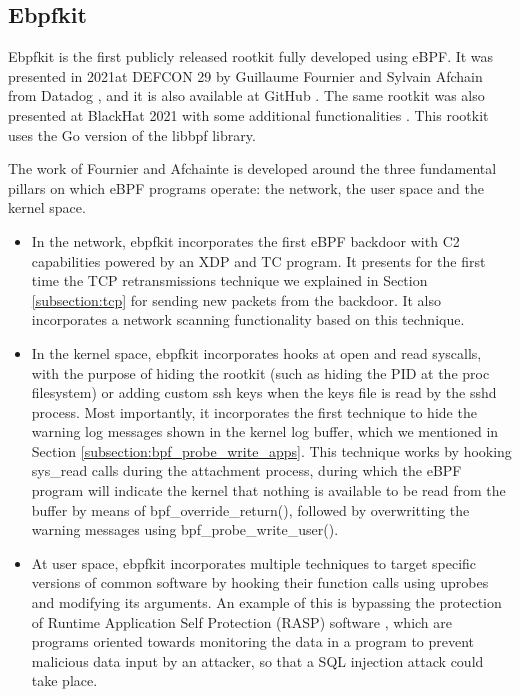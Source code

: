 \subsection{Ebpfkit}
Ebpfkit is the first publicly released rootkit fully developed using eBPF.
It was presented in 2021at DEFCON 29 by Guillaume Fournier and Sylvain Afchain from
Datadog \cite{ebpf_friends}, and it is also available at
GitHub \cite{ebpf_friends_github}. The same rootkit was also presented at
BlackHat 2021 with some additional functionalities
\cite{ebpf_friends_blackhat}. This rootkit uses the Go version of the
libbpf library.

The work of Fournier and Afchainte is developed around the three
fundamental pillars on which eBPF programs operate: the network, the user
space and the kernel space.
\begin{itemize}
\item In the network, ebpfkit incorporates the first eBPF backdoor with C2 capabilities powered by an XDP and TC program. It presents for the first time the TCP retransmissions technique we explained in Section \ref{subsection:tcp} for sending new packets from the backdoor. It also incorporates a network scanning functionality based on this technique.

\item In the kernel space, ebpfkit incorporates hooks at open and read syscalls, with the purpose of hiding the rootkit (such as hiding the PID at the proc filesystem) or adding custom ssh keys when the keys file is read by the sshd process. Most importantly, it incorporates the first technique to hide the warning log messages shown in the kernel log buffer, which we mentioned in Section \ref{subsection:bpf_probe_write_apps}. This technique works by hooking sys\_read calls during the attachment process, during which the eBPF program will indicate the kernel that nothing is available to be read from the buffer by means of bpf\_override\_return(), followed by overwritting the warning messages using bpf\_probe\_write\_user().
\item At user space, ebpfkit incorporates multiple techniques to target specific versions of common software by hooking their function calls using uprobes and modifying its arguments. An example of this is bypassing the protection of Runtime Application Self Protection (RASP) software \cite{rasps}, which are programs oriented towards monitoring the data in a program to prevent malicious data input by an attacker, so that a SQL injection attack \cite{sql_injection} could take place.
\end{itemize}

